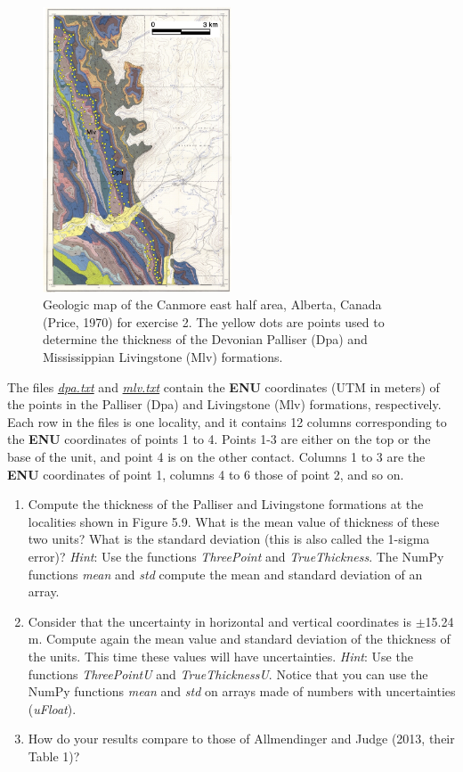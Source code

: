 \documentclass[a4paper , 12pt]{book}
\begin{document}
\begin{enumerate}
     \begin{figure}
        \caption{Geologic map of the Canmore east half area, Alberta, Canada (Price, 1970) for exercise 2. The yellow dots are points used to determine the thickness of the Devonian Palliser (Dpa) and Mississippian Livingstone (Mlv) formations.}
        \includegraphics[width=0.5\textwidth]{Figures/ch5f14.jpg}
    \end{figure}
    
    The files \href{http://github.com}{\textit{dpa.txt}} and \href{http://github.com}{\textit{mlv.txt}} contain the \textbf{ENU} coordinates (UTM in meters) of the points in the Palliser (Dpa) and Livingstone (Mlv) formations, respectively. Each row in the files is one locality, and it contains 12 columns corresponding to the \textbf{ENU} coordinates of points 1 to 4. Points 1-3 are either on the top or the base of the unit, and point 4 is on the other contact. Columns 1 to 3 are the \textbf{ENU} coordinates of point 1, columns 4 to 6 those of point 2, and so on.
    
    \begin{enumerate}
        \item Compute the thickness of the Palliser and Livingstone formations at the localities shown in Figure 5.9. What is the mean value of thickness of these two units? What is the standard deviation (this is also called the 1-sigma error)? \textit{Hint}: Use the functions \textit{ThreePoint} and \textit{TrueThickness}. The NumPy functions \textit{mean} and \textit{std} compute the mean and standard deviation of an array.
        \item Consider that the uncertainty in horizontal and vertical coordinates is $\pm$15.24 m. Compute again the mean value and standard deviation of the thickness of the units. This time these values will have uncertainties. \textit{Hint}: Use the functions \textit{ThreePointU} and \textit{TrueThicknessU}. Notice that you can use the NumPy functions \textit{mean} and \textit{std} on arrays made of numbers with uncertainties (\textit{uFloat}).
        \item How do your results compare to those of Allmendinger and Judge (2013, their Table 1)?
    \end{enumerate}{}
    

\end{enumerate}
\end{document}
